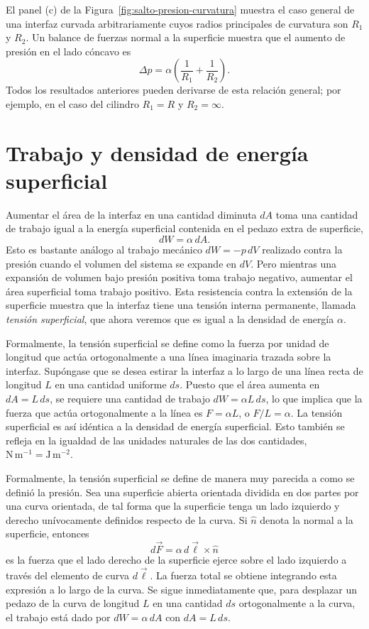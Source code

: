El panel (c) de la Figura~\ref{fig:salto-presion-curvatura} muestra el caso general de una interfaz curvada arbitrariamente cuyos radios principales de curvatura son $R_1$ y $R_2$. Un balance de fuerzas normal a la superficie muestra que el aumento de presión en el lado cóncavo es
$$ \Delta p = \alpha\left(\frac{1}{R_1} + \frac{1}{R_2}\right). $$
Todos los resultados anteriores pueden derivarse de esta relación general; por ejemplo, en el caso del cilindro $R_1 = R$ y $R_2 = \infty$.

\section{Trabajo y densidad de energía superficial}

Aumentar el área de la interfaz en una cantidad diminuta $dA$ toma una cantidad de trabajo igual a la energía superficial contenida en el pedazo extra de superficie,
$$ dW = \alpha\, dA. $$
Esto es bastante análogo al trabajo mecánico $dW = -p\,dV$ realizado contra la presión cuando el volumen del sistema se expande en $dV$. Pero mientras una expansión de volumen bajo presión positiva toma trabajo negativo, aumentar el área superficial toma trabajo positivo. Esta resistencia contra la extensión de la superficie muestra que la interfaz tiene una tensión interna permanente, llamada \emph{tensión superficial}, que ahora veremos que es igual a la densidad de energía $\alpha$.

Formalmente, la tensión superficial se define como la fuerza por unidad de longitud que actúa ortogonalmente a una línea imaginaria trazada sobre la interfaz. Supóngase que se desea estirar la interfaz a lo largo de una línea recta de longitud $L$ en una cantidad uniforme $ds$. Puesto que el área aumenta en $dA = L\,ds$, se requiere una cantidad de trabajo $dW = \alpha L\,ds$, lo que implica que la fuerza que actúa ortogonalmente a la línea es $F = \alpha L$, o $F/L = \alpha$. La tensión superficial es así idéntica a la densidad de energía superficial. Esto también se refleja en la igualdad de las unidades naturales de las dos cantidades, $\mathrm{N\,m^{-1}} = \mathrm{J\,m^{-2}}$.

\figuraMarcoPeliculaMovil

Formalmente, la tensión superficial se define de manera muy parecida a como se definió la presión. Sea una superficie abierta orientada dividida en dos partes por una curva orientada, de tal forma que la superficie tenga un lado izquierdo y derecho unívocamente definidos respecto de la curva. Si $\hat{n}$ denota la normal a la superficie, entonces
$$ d\vec{F} = \alpha\, d\vec{\ell}\times\hat{n} $$
es la fuerza que el lado derecho de la superficie ejerce sobre el lado izquierdo a través del elemento de curva $d\vec{\ell}$. La fuerza total se obtiene integrando esta expresión a lo largo de la curva. Se sigue inmediatamente que, para desplazar un pedazo de la curva de longitud $L$ en una cantidad $ds$ ortogonalmente a la curva, el trabajo está dado por $dW = \alpha\,dA$ con $dA = L\,ds$.


